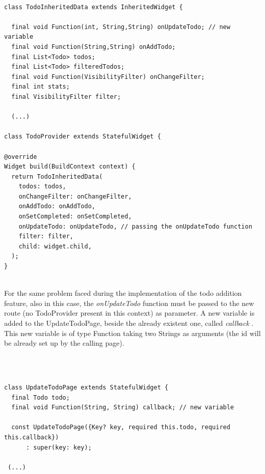 \begin{code}

\mbox{}

\label{code:2.38}
\begin{verbatim}

class TodoInheritedData extends InheritedWidget {
  
  final void Function(int, String,String) onUpdateTodo; // new variable
  final void Function(String,String) onAddTodo; 
  final List<Todo> todos;
  final List<Todo> filteredTodos;
  final void Function(VisibilityFilter) onChangeFilter;
  final int stats;
  final VisibilityFilter filter;

  (...)

class TodoProvider extends StatefulWidget {

@override
Widget build(BuildContext context) {
  return TodoInheritedData(
    todos: todos,
    onChangeFilter: onChangeFilter,
    onAddTodo: onAddTodo,
    onSetCompleted: onSetCompleted,
    onUpdateTodo: onUpdateTodo, // passing the onUpdateTodo function
    filter: filter,
    child: widget.child,
  );
}
\end{verbatim}
\end{code}
\mbox{}\\
For the same problem faced during the implementation of the todo addition feature, also in this case, the \textit{onUpdateTodo } function must be passed to the new route (no TodoProvider present in this context) as parameter. A new variable is added to the UpdateTodoPage, beside the already existent one, called \textit{callback }. This new variable is of type Function taking two Strings as arguments (the id will be already set up by the calling page).
\begin{code}
\mbox{}\\
\mbox{}
\label{code:2.39}
\begin{verbatim}

class UpdateTodoPage extends StatefulWidget {
  final Todo todo;
  final void Function(String, String) callback; // new variable

  const UpdateTodoPage({Key? key, required this.todo, required this.callback})
      : super(key: key);
 
 (...)
 
 \end{verbatim}
 \end{code}
